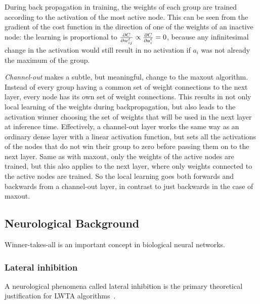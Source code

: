         During back propagation in training, the weights of each group are trained according to the activation of the most active node. This can be seen from the gradient of the cost function in the direction of one of the weights of an inactive node: the learning is proportional to $\pd[w^{\ell}_{ij}]{C} \propto \pd[a^\ell_i]{C} = 0$, because any infinitesimal change in the activation would still result in no activation if $a_i$ was not already the maximum of the group.



        \textit{Channel-out} makes a subtle, but meaningful, change to the maxout algorithm. Instead of every group having a common set of weight connections to the next layer, every node has its own set of weight connections. This results in not only local learning of the weights during backpropagation, but also leads to the activation winner choosing the set of weights that will be used in the next layer at inference time.
        Effectively, a channel-out layer works the same way as an ordinary dense layer with a linear activation function, but sets all the activations of the nodes that do not win their group to zero before passing them on to the next layer.
        Same as with maxout, only the weights of the active nodes are trained, but this also applies to the next layer, where only weights connected to the active nodes are trained. So the local learning goes both forwards and backwards from a channel-out layer, in contrast to just backwards in the case of maxout.

    \subsection{Neurological Background}
    Winner-takes-all is an important concept in biological neural networks. 
     \Anna

    \subsubsection{Lateral inhibition}
    A neurological phenomena called lateral inhibition is the primary theoretical justification for LWTA algorithms~\citep{Chen}. 

    
        
